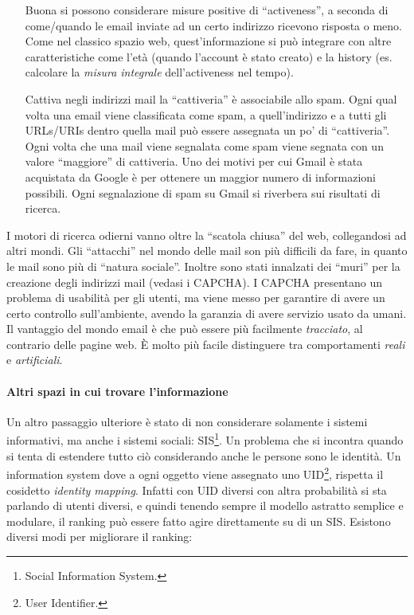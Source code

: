 \begin{itemize}

  \item[Buona] si possono considerare misure positive di ``activeness'', a seconda di come/quando le email inviate ad un certo indirizzo ricevono risposta o meno. Come nel classico spazio web, quest'informazione si pu\`o integrare con altre caratteristiche come l'et\`a (quando l'account \`e stato creato) e la history (es. calcolare la \textit{misura integrale} dell'activeness nel tempo).

  \item[Cattiva] negli indirizzi mail la ``cattiveria'' \`e associabile allo spam. Ogni qual volta una email viene classificata come spam, a quell'indirizzo e a tutti gli URLs/URIs dentro quella mail pu\`o essere assegnata un po' di ``cattiveria''. Ogni volta che una mail viene segnalata come spam viene segnata con un valore ``maggiore'' di cattiveria. Uno dei motivi per cui Gmail \`e stata acquistata da Google \`e per ottenere un maggior numero di informazioni possibili. Ogni segnalazione di spam su Gmail si riverbera sui risultati di ricerca.

\end{itemize}

I motori di ricerca odierni vanno oltre la ``scatola chiusa'' del web, collegandosi ad altri mondi. Gli ``attacchi'' nel mondo delle mail son pi\`u difficili da fare, in quanto le mail sono pi\`u di ``natura sociale''. Inoltre sono stati innalzati dei ``muri'' per la creazione degli indirizzi mail (vedasi  i CAPCHA). I CAPCHA presentano un problema di usabilit\`a per gli utenti, ma viene messo per garantire di avere un certo controllo sull'ambiente, avendo la garanzia di avere servizio usato da umani.
Il vantaggio del mondo email \`e che pu\`o essere pi\`u facilmente \textit{tracciato}, al contrario delle pagine web. \`E molto pi\`u facile distinguere tra comportamenti \textit{reali} e \textit{artificiali}.

\paragraph*{Altri spazi in cui trovare l'informazione}

Un altro passaggio ulteriore \`e stato di non considerare solamente i sistemi informativi, ma anche i sistemi sociali: SIS\footnote{Social Information System.}. Un problema che si incontra quando si tenta di estendere tutto ci\`o considerando anche le persone sono le identit\`a. Un information system dove a ogni oggetto viene assegnato uno UID\footnote{User Identifier.}, rispetta il cosidetto \textit{identity mapping}. Infatti con UID diversi con altra probabilit\`a si sta parlando di utenti diversi, e quindi tenendo sempre il modello astratto semplice e modulare, il ranking pu\`o essere fatto agire direttamente su di un SIS. Esistono diversi modi per migliorare il ranking:

